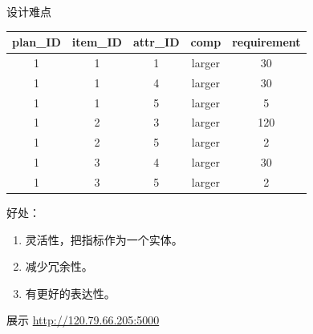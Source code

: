 \documentclass{beamer}
\begin{document}
\begin{frame}{设计难点}
{  }
  

   {

    \begin{tabular}{|c|c|c|c|c|}
      \hline
      plan\_ID & item\_ID & attr\_ID & comp   & requirement  \\ \hline
      1 &       1 &       1 & larger &          30  \\ \hline
      1 &       1 &       4 & larger &          30  \\ \hline
      1 &       1 &       5 & larger &           5  \\ \hline
      1 &       2 &       3 & larger &         120  \\ \hline
      1 &       2 &       5 & larger &           2  \\ \hline
      1 &       3 &       4 & larger &          30  \\ \hline
      1 &       3 &       5 & larger &           2  \\ \hline
      \end{tabular}

    好处：
    \begin{enumerate}
    \item 灵活性，把指标作为一个实体。
    \item 减少冗余性。
    \item 有更好的表达性。
    \end{enumerate}
  }
    
\end{frame}
  
\begin{frame}{展示}
\url{http://120.79.66.205:5000}
\end{frame}
\end{document}
